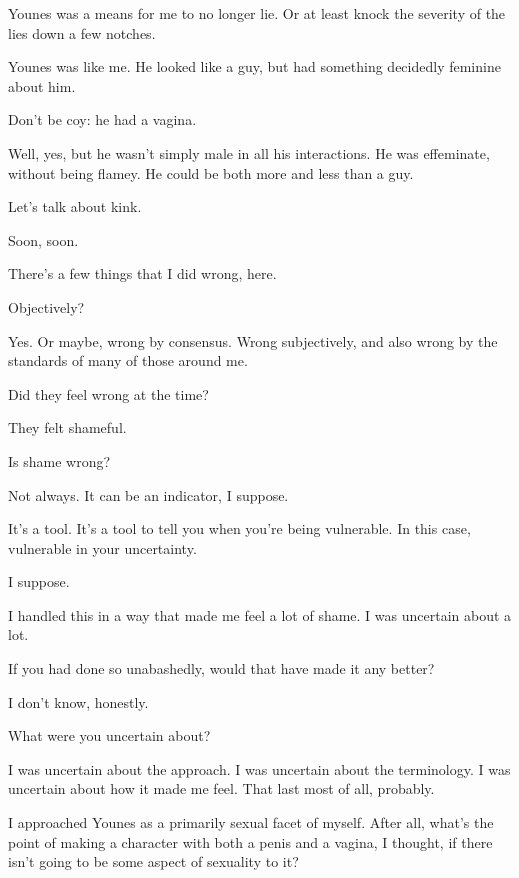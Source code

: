 \begin{paracol}{2}
\begin{leftcolumn}
Younes was a means for me to no longer lie. Or at least knock the severity of the lies down a few notches.

Younes was like me. He looked like a guy, but had something decidedly feminine about him.

\begin{ally}
Don't be coy: he had a vagina.
\end{ally}
Well, yes, but he wasn't simply male in all his interactions. He was effeminate, without being flamey. He could be both more and less than a guy.

\begin{ally}
Let's talk about kink.
\end{ally}
Soon, soon.
\newpage

\noindent There's a few things that I did wrong, here.

\begin{ally}
Objectively?
\end{ally}
Yes. Or maybe, wrong by consensus. Wrong subjectively, and also wrong by the standards of many of those around me.

\begin{ally}
Did they feel wrong at the time?
\end{ally}
They felt shameful.

\begin{ally}
Is shame wrong?
\end{ally}
Not always. It can be an indicator, I suppose.

\begin{ally}
It's a tool. It's a tool to tell you when you're being vulnerable. In this case, vulnerable in your uncertainty.
\end{ally}
I suppose.

I handled this in a way that made me feel a lot of shame. I was uncertain about a lot.

\begin{ally}
If you had done so unabashedly, would that have made it any better?
\end{ally}
I don't know, honestly.

\begin{ally}
What were you uncertain about?
\end{ally}
I was uncertain about the approach. I was uncertain about the terminology. I was uncertain about how it made me feel. That last most of all, probably.

I approached Younes as a primarily sexual facet of myself. After all, what's the point of making a character with both a penis and a vagina, I thought, if there isn't going to be some aspect of sexuality to it?


\end{leftcolumn}
\end{paracol}
